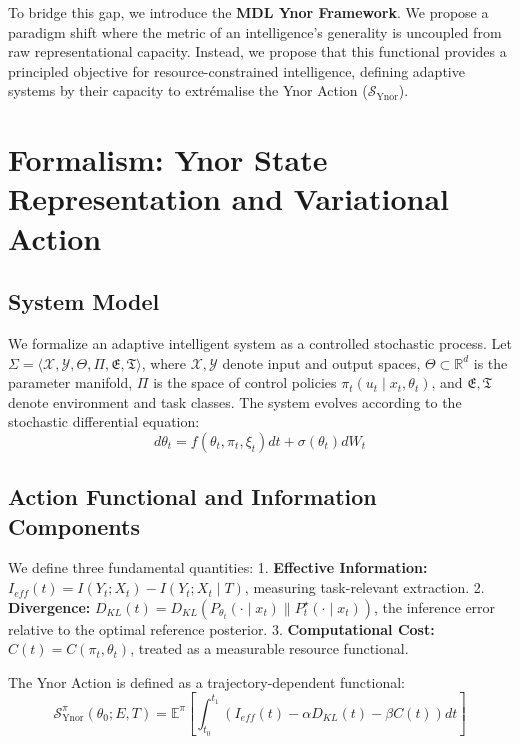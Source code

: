 \documentclass{article}
\begin{document}
To bridge this gap, we introduce the \textbf{MDL Ynor Framework}. We propose a paradigm shift where the metric of an intelligence's generality is uncoupled from raw representational capacity. Instead, we propose that this functional provides a principled objective for resource-constrained intelligence, defining adaptive systems by their capacity to extr\'emalise the Ynor Action ($\mathcal{S}_{\text{Ynor}}$).

\section{Formalism: Ynor State Representation and Variational Action}

\subsection{System Model}
We formalize an adaptive intelligent system as a controlled stochastic process. Let $\Sigma = \langle \mathcal{X}, \mathcal{Y}, \Theta, \Pi, \mathfrak{E}, \mathfrak{T} \rangle$, where $\mathcal{X}, \mathcal{Y}$ denote input and output spaces, $\Theta \subset \mathbb{R}^d$ is the parameter manifold, $\Pi$ is the space of control policies $\pi_t(u_t \mid x_t, \theta_t)$, and $\mathfrak{E}, \mathfrak{T}$ denote environment and task classes. The system evolves according to the stochastic differential equation:
\begin{equation}
d\theta_t = f(\theta_t, \pi_t, \xi_t) dt + \sigma(\theta_t) dW_t
\end{equation}

\subsection{Action Functional and Information Components}
We define three fundamental quantities:
1. \textbf{Effective Information:} $I_{eff}(t) = I(Y_t; X_t) - I(Y_t; X_t \mid T)$, measuring task-relevant extraction.
2. \textbf{Divergence:} $D_{KL}(t) = D_{KL}(P_{\theta_t}(\cdot \mid x_t) \parallel P_t^\star(\cdot \mid x_t))$, the inference error relative to the optimal reference posterior.
3. \textbf{Computational Cost:} $C(t) = C(\pi_t, \theta_t)$, treated as a measurable resource functional.

The Ynor Action is defined as a trajectory-dependent functional:
\begin{equation}
\mathcal{S}_{\text{Ynor}}^\pi(\theta_0; E, T) = \mathbb{E}^\pi \left[ \int_{t_0}^{t_1} \left( I_{eff}(t) - \alpha D_{KL}(t) - \beta C(t) \right) dt \right]
\end{equation}
\end{document}
